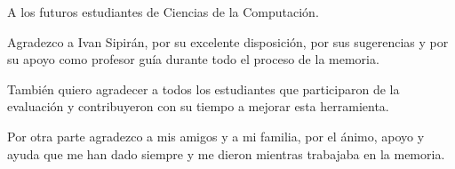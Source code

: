 \documentclass{umemoria}
\begin{document}

\begin{dedicatoria}
A los futuros estudiantes de Ciencias de la Computación.
\end{dedicatoria}

\begin{thanks}

Agradezco a Ivan Sipirán, por su excelente disposición, por sus sugerencias y por su apoyo como profesor guía durante todo el proceso de la memoria.

También quiero agradecer a todos los estudiantes que participaron de la evaluación y contribuyeron con su tiempo a mejorar esta herramienta.

Por otra parte agradezco a mis amigos y a mi familia, por el ánimo, apoyo y ayuda que me han dado siempre y me dieron mientras trabajaba en la memoria.



\end{thanks}

\tableofcontents
\listoftables %
\listoffigures %

\mainmatter









\printbibliography[
    heading=bibintoc,
]
\end{document}
